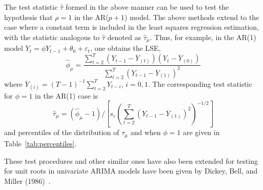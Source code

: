 The test statistic $\hat{\tau}$ formed in the above manner can be used to test the hypothesis that $\rho = 1$ in the AR($p+1$) model. The above methods extend to the case where a constant term is included in the least squares regression estimation, with the statistic analogous to $\hat{\tau}$ denoted as $\hat{\tau}_\mu$. Thus, for example, in the AR(1) model $Y_t = \phi Y_{t-1} + \theta_0 + \varepsilon_t$, one obtains the LSE,
	\begin{equation}\label{eqn:hatphinewest}
	\hat{\phi}_{\mu} = \dfrac{\sum_{t=2}^T(Y_{t-1} - \overline{Y}_{(t)})(Y_t - \overline{Y}_{(0)})}{\sum_{t=2}^T(Y_{t-1} - \overline{Y}_{(1)})^2}
	\end{equation}
where $\overline{Y}_{(i)} = (T - 1)^{-1}\sum_{t=2}^TY_{t-i}$, $i = 0,1$. The corresponding test statistic for $\phi = 1$ in the AR(1) case is
	\begin{equation}\label{eqn:anotherhattau}
	\hat{\tau}_\mu = (\hat{\phi}_\mu - 1)/[s_{\varepsilon}(\sum_{t=2}^T(Y_{t-1} - \overline{Y}_{(1)})^2)^{-1/2}]
	\end{equation}
and percentiles of the distribution of $\hat{\tau}_\mu$ and when $\phi = 1$ are given in Table~\ref{tab:percentiles}.


These test procedures and other similar ones have also been extended for testing for unit roots in univariate ARIMA models have been given by Dickey, Bell, and Miller (1986)~\cite{dickey1986}.



